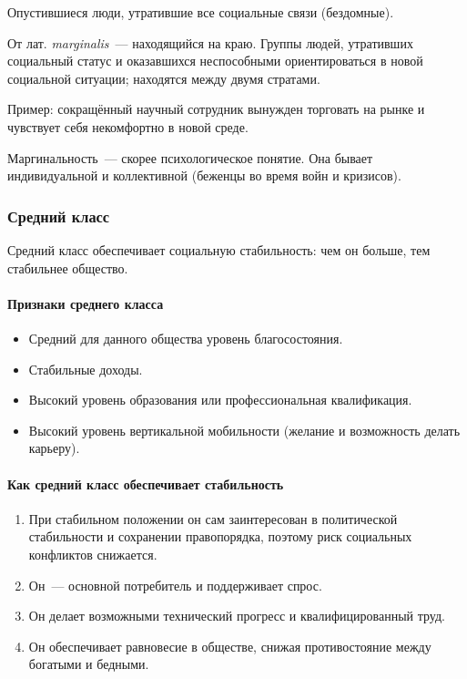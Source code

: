 \documentclass[12pt]{article}
\begin{document}
	\begin{definition}[Андеркласс]
		Опустившиеся люди, утратившие все социальные связи (бездомные).
	\end{definition}

	\begin{definition}
		От лат. \textit{marginalis}~--- находящийся на краю. Группы людей, утративших социальный статус и оказавшихся неспособными ориентироваться в новой социальной ситуации; находятся между двумя стратами.

		Пример: сокращённый научный сотрудник вынужден торговать на рынке и чувствует себя некомфортно в новой среде.
	\end{definition}

	\begin{note}
		Маргинальность~--- скорее психологическое понятие. Она бывает индивидуальной и коллективной (беженцы во время войн и кризисов).
	\end{note}

	\subsubsection{Средний класс}

	Средний класс обеспечивает социальную стабильность: чем он больше, тем стабильнее общество.

	\paragraph{Признаки среднего класса}
	\begin{itemize}
		\item Средний для данного общества уровень благосостояния.
		\item Стабильные доходы.
		\item Высокий уровень образования или профессиональная квалификация.
		\item Высокий уровень вертикальной мобильности (желание и возможность делать карьеру).
	\end{itemize}

	\paragraph{Как средний класс обеспечивает стабильность}
	\begin{enumerate}
		\item При стабильном положении он сам заинтересован в политической стабильности и сохранении правопорядка, поэтому риск социальных конфликтов снижается.
		\item Он~--- основной потребитель и поддерживает спрос.
		\item Он делает возможными технический прогресс и квалифицированный труд.
		\item Он обеспечивает равновесие в обществе, снижая противостояние между богатыми и бедными.
	\end{enumerate}
\end{document}
